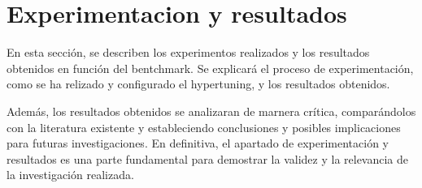 \section{Experimentacion y resultados}
En esta sección, se describen los experimentos realizados y los resultados
obtenidos en función del bentchmark. Se explicará el proceso de experimentación,
como se ha relizado y configurado el hypertuning, y los resultados obtenidos.\medskip

Además, los resultados obtenidos se analizaran de marnera crítica, 
comparándolos con la literatura existente y estableciendo conclusiones y 
posibles implicaciones para futuras investigaciones. En definitiva, el 
apartado de experimentación y resultados es una parte fundamental para 
demostrar la validez y la relevancia de la investigación realizada.





\pagebreak
